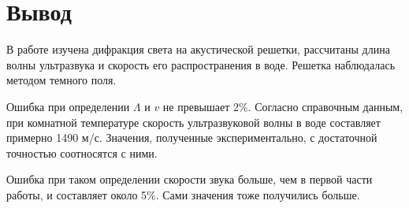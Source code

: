 \section{Вывод}

В работе изучена дифракция света на акустической решетки, рассчитаны длина волны ультразвука и скорость его распространения в воде. Решетка наблюдалась методом
темного поля.

Ошибка при определении $ \Lambda $ и $ v $ не превышает 2\%. Согласно справочным данным, при комнатной температуре скорость ультразвуковой волны в воде составляет примерно 1490 м/с. Значения, полученные экспериментально, с достаточной точностью соотносятся с ними.

Ошибка при таком определении скорости звука больше, чем в первой части работы, и
составляет около 5\%. Сами значения тоже получились больше.


